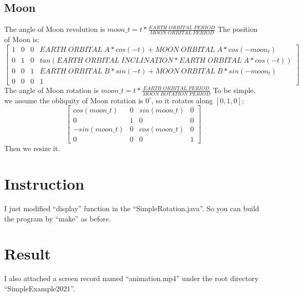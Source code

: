 \documentclass{article}
\begin{document}
\subsection*{Moon}
The angle of Moon revolution is $moon\_t = t * \frac{EARTH \; ORBITAL \; PERIOD}{MOON \; ORBITAL \; PERIOD}$
The position of Moon is:
\begin{equation}
  \begin{bmatrix}
    1 & 0 & 0 & EARTH \; ORBITAL \; A * cos(-t) +  MOON \; ORBITAL \; A * cos(-moon_t)         \\
    0 & 1 & 0 & tan(EARTH \; ORBITAL \; INCLINATION * EARTH \; ORBITAL \; A * cos(-t))     \\
    0 & 0 & 1 & EARTH \; ORBITAL \; B * sin(-t)  +  MOON \; ORBITAL \; B * sin(-moon_t)          \\
    0 & 0 & 0 & 1
  \end{bmatrix}
\end{equation}
The angle of Moon rotation is $moon\_t = t * \frac{EARTH \; ORBITAL \; PERIOD}{MOON \; ROTATION \; PERIOD}$
To be simple, we assume the obliquity of Moon rotation is $0^{\circ}$, so it rotates along $[0, 1, 0]$:
\begin{equation}
  \begin{bmatrix}
    cos(moon\_t) & 0 & sin(moon\_t) & 0   \\
    0 & 1 & 0 & 0   \\
    -sin(moon\_t) & 0 & cos(moon\_t) & 0   \\
    0 & 0 & 0 & 1
  \end{bmatrix}
\end{equation}
Then we resize it.

\section*{Instruction}
I just modified ``display'' function in the ``SimpleRotation.java''. So you can build the program by ``make'' as before.


\section*{Result}

I also attached a screen record named ``animation.mp4'' under the root directory ``SimpleExample2021''.
\end{document}
